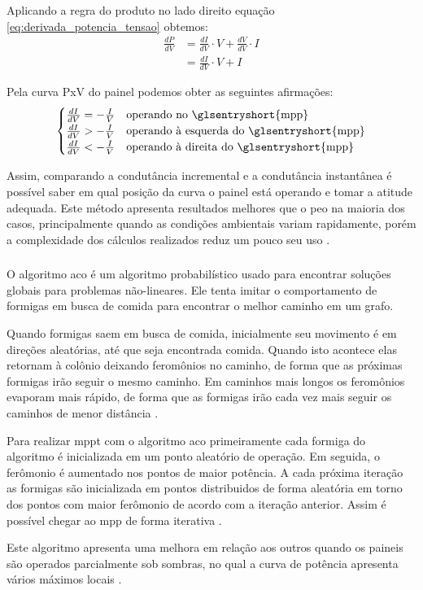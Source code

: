 Aplicando a regra do produto no lado direito equação \ref{eq:derivada_potencia_tensao} obtemos:
\begin{equation}
\begin{aligned}
\frac{dP}{dV} &= \frac{dI}{dV}\cdot V + \frac{dV}{dV}\cdot I \\
&= \frac{dI}{dV}\cdot V + I
\end{aligned}
\end{equation}

Pela curva PxV do painel podemos obter as seguintes afirmações:
\begin{gather*}
\begin{cases}
\frac{dI}{dV} = -\frac{I}{V} & \text{operando no \glsentryshort{mpp}} \\
\frac{dI}{dV} > -\frac{I}{V} & \text{operando à esquerda do \glsentryshort{mpp}} \\
\frac{dI}{dV} < -\frac{I}{V} & \text{operando à direita do \glsentryshort{mpp}}
\end{cases}
\end{gather*}

Assim, comparando a condutância incremental e a condutância instantânea é possível saber em qual posição da curva o painel está operando e tomar a atitude adequada. Este método apresenta resultados melhores que o \gls{peo} na maioria dos casos, principalmente quando as condições ambientais variam rapidamente, porém a complexidade dos cálculos realizados reduz um pouco seu uso \cite{tofoli2015}.

\subsubsection{}

O algoritmo \gls{aco} é um algoritmo probabilístico usado para encontrar soluções globais para problemas não-lineares. Ele tenta imitar o comportamento de formigas em busca de comida para encontrar o melhor caminho em um grafo.

Quando formigas saem em busca de comida, inicialmente seu movimento é em direções aleatórias, até que seja encontrada comida. Quando isto acontece elas retornam à colônio deixando feromônios no caminho, de forma que as próximas formigas irão seguir o mesmo caminho. Em caminhos mais longos os feromônios evaporam mais rápido, de forma que as formigas irão cada vez mais seguir os caminhos de menor distância \cite{dorigo2006}.

Para realizar \gls{mppt} com o algoritmo \gls{aco} primeiramente cada formiga do algoritmo é inicializada em um ponto aleatório de operação. Em seguida, o ferômonio é aumentado nos pontos de maior potência. A cada próxima iteração as formigas são inicializada em pontos distribuidos de forma aleatória em torno dos pontos com maior ferômonio de acordo com a iteração anterior. Assim é possível chegar ao \gls{mpp} de forma iterativa \cite{jiang2013}.

Este algoritmo apresenta uma melhora em relação aos outros quando os paineis são operados parcialmente sob sombras, no qual a curva de potência apresenta vários máximos locais \cite{jiang2013}.



